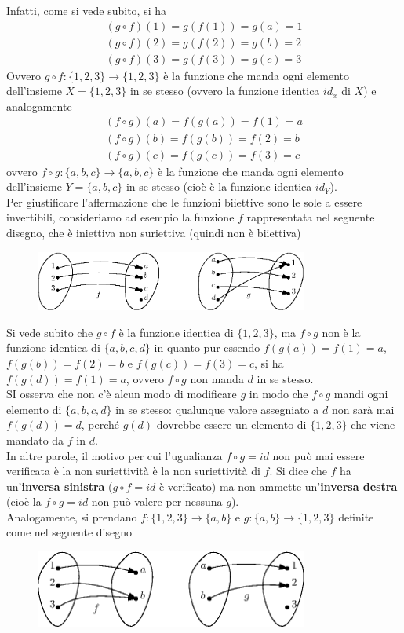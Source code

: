 \documentclass{book}
\begin{document}
Infatti, come si vede subito, si ha
\begin{eqnarray*}
  (g\circ f)(1)=g(f(1))=g(a)=1\\
  (g\circ f)(2)=g(f(2))=g(b)=2\\ 
  (g\circ f)(3)=g(f(3))=g(c)=3
\end{eqnarray*}
Ovvero $g\circ f: \{1,2,3\}\to \{1,2,3\}$ è la funzione che manda ogni elemento dell'insieme $X=\{1,2,3\}$ in se
stesso (ovvero la funzione identica $id_x$ di $X$) e analogamente
\begin{eqnarray*}
  (f\circ g)(a)=f(g(a))=f(1)=a\\
  (f\circ g)(b)=f(g(b))=f(2)=b\\ 
  (f\circ g)(c)=f(g(c))=f(3)=c
\end{eqnarray*}
ovvero $f \circ g: \{a,b,c\}\to \{a,b,c\}$ è la funzione che manda ogni elemento dell'insieme $Y=\{a,b,c\}$ in se
stesso (cioè è la funzione identica $id_Y$).\\
Per giustificare l'affermazione che le funzioni biiettive sono le sole a essere invertibili, consideriamo ad
esempio la funzione $f$ rappresentata nel seguente disegno, che è iniettiva non suriettiva (quindi non è
biiettiva)
\begin{figure}[ht]
  \centering
  \includegraphics[width=9cm]{img/finiti/imgex4-5-2.eps}
\end{figure}

Si vede subito che $g\circ f$ è la funzione identica di $\{1,2,3\}$, ma $f\circ g$ non è la funzione identica di
$\{a,b,c,d\}$ in quanto pur essendo $f(g(a))=f(1)=a$, $f (g(b)) = f (2) = b$ e $f(g(c)) = f (3) = c$, si ha
$f(g(d))=f(1)=a$, ovvero $f\circ g$ non manda $d$ in se stesso.\\
SI osserva che non c'è alcun modo di modificare $g$ in modo che $f\circ g$ mandi ogni elemento di $\{a,b,c,d\}$
in se stesso: qualunque valore assegniato a $d$ non sarà mai $f(g(d))=d$, perché $g(d)$ dovrebbe essere un
elemento di $\{1,2,3\}$ che viene mandato da $f$ in $d$.\\
In altre parole, il motivo per cui l'ugualianza $f\circ g =id$ non può mai essere verificata è la non suriettività
è la non suriettività di $f$. Si dice che $f$ ha un'\textbf{inversa sinistra} ($g\circ f=id$ è verificato) ma non
ammette un'\textbf{inversa destra} (cioè la $f\circ g= id$ non può valere per nessuna $g$).\\
Analogamente, si prendano $f:\{1,2,3\}\to \{a,b\}$ e $g:\{a,b\}\to \{1,2,3\}$ definite come nel seguente disegno
\begin{figure}[ht]
  \centering
  \includegraphics[width=9cm]{img/finiti/imgex4-5-3.eps}
\end{figure}
\end{document}
